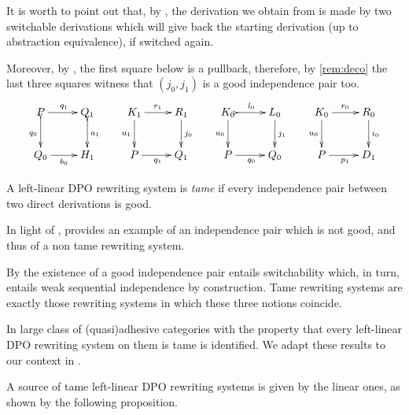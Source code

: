 \documentclass[a4paper,UKenglish,cleveref,pdftex, thm-restate,numberwithinsect]{lipics}
\begin{document}
\begin{remark}\label{rem:church}It is worth to point out that, by , the derivation we obtain from  is made by two switchable derivations which will give back the starting derivation (up to abstraction equivalence), if switched again. 

Moreover, by , the first square below is a pullback, therefore, by \cref{rem:deco}  the last three squares witness that $(j_0, j_1)$ is a good independence pair too.
		\[\xymatrix{P\ar[r]^{q_1} \ar@{>->}[d]_{q_0}&Q_1 \ar@{>->}[d]^{a_1}&K_1 \ar[r]^{r_1}  \ar[d]_{u_1}& R_1 \ar[d]^{j_0} & K_0 \ar@{>->}[r]^{l_0}  \ar[d]_{u_0}& L_0 \ar[d]^{j_1}&K_0 \ar[r]^{r_0} \ar[d]_{u_0}& R_0\ar[d]^{i_0} \\ Q_ 0\ar[r]_{b_0}&H_1&P \ar[r]_{q_1} & Q_1 &P \ar[r]_{q_0}  & Q_0&P \ar[r]_{p_1} & D_1}\]
	\end{remark}



\begin{definition}A left-linear DPO rewriting system is \emph{tame} if every independence pair between two direct derivations is good.
\end{definition}
\begin{example}\label{ex:diff2}In light of ,   provides an example of an independence pair which is not good, and thus of a non tame rewriting system.
\end{example}
\begin{remark}
	By  the existence of a good independence pair entails switchability which, in turn, entails weak sequential independence by construction. Tame rewriting systems are exactly those rewriting systems in which these three notions coincide.
\end{remark}

\begin{remark} In \cite{baldan2011adhesivity} large class of (quasi)adhesive categories with the property that every left-linear DPO rewriting system on them is tame is identified. We adapt these results to our context in . 
\end{remark}



A source of tame left-linear DPO rewriting systems is given by the linear ones, as shown by the following proposition.
\end{document}
